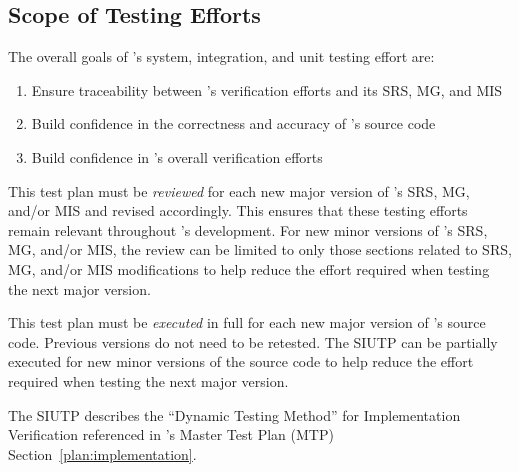 \subsection{Scope of Testing Efforts}
The overall goals of \progname{}'s system, integration, and unit testing effort
are:
\begin{enumerate}

    \item Ensure traceability between \progname{}'s verification efforts and
    its SRS, MG, and MIS

    \item Build confidence in the correctness and accuracy of \progname{}'s
    source code

    \item Build confidence in \progname{}'s overall verification efforts

\end{enumerate}

This test plan must be \textit{reviewed} for each new major version of
\progname{}'s SRS, MG, and/or MIS and revised accordingly. This ensures that
these testing efforts remain relevant throughout \progname{}'s development. For
new minor versions of \progname{}'s SRS, MG, and/or MIS, the review can be
limited to only those sections related to SRS, MG, and/or MIS modifications to
help reduce the effort required when testing the next major version.

This test plan must be \textit{executed} in full for each new major version of
\progname{}'s source code. Previous versions do not need to be retested. The
SIUTP can be partially executed for new minor versions of the source code to
help reduce the effort required when testing the next major version.

The SIUTP describes the ``Dynamic Testing Method'' for Implementation
Verification referenced in \progname{}'s Master Test Plan (MTP)
Section~\ref{plan:implementation}.